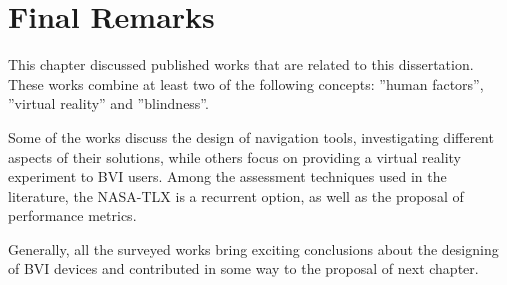\section{Final Remarks}
\label{sec:final_remarks3}

This chapter discussed published works that are related to this dissertation. These works combine at least two of the following concepts: ”human factors”, ”virtual reality” and ”blindness”. 

Some of the works discuss the design of navigation tools, investigating different aspects of their solutions, while others focus on providing a virtual reality experiment to BVI users. Among the assessment techniques used in the literature, the NASA-TLX is a recurrent option, as well as the proposal of performance metrics.

Generally, all the surveyed works bring exciting conclusions about the designing of BVI devices and contributed in some way to the proposal of next chapter.

